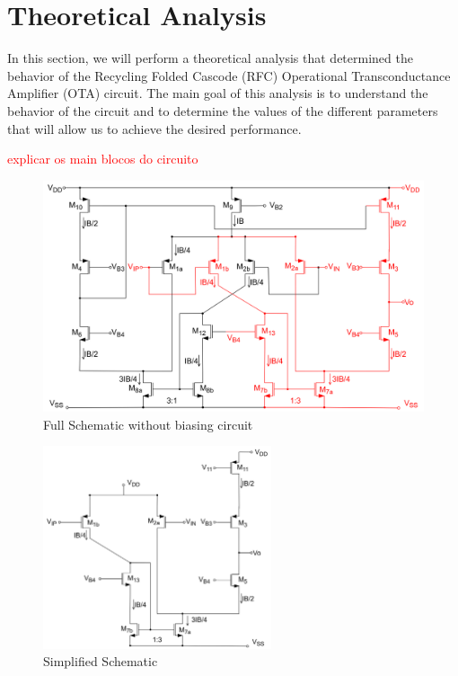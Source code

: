 \section{Theoretical Analysis}

In this section, we will perform a theoretical analysis that determined the behavior of the Recycling Folded Cascode (RFC) Operational Transconductance Amplifier (OTA) circuit. The main goal of this analysis is to understand the behavior of the circuit and to determine the values of the different parameters that will allow us to achieve the desired performance.

\textcolor{red}{explicar os main blocos do circuito}

\begin{figure}[H]
    \centering
    \includegraphics[width=1\textwidth]{Images/full_sch.png}
    \caption{Full Schematic without biasing circuit}
    \label{fig:full_schematic}
\end{figure}

\begin{figure}[H]
    \centering
    \includegraphics[width=0.6\textwidth]{Images/simplified_sch.png}
    \caption{Simplified Schematic}
    \label{fig:simplified_schematic}
\end{figure}



